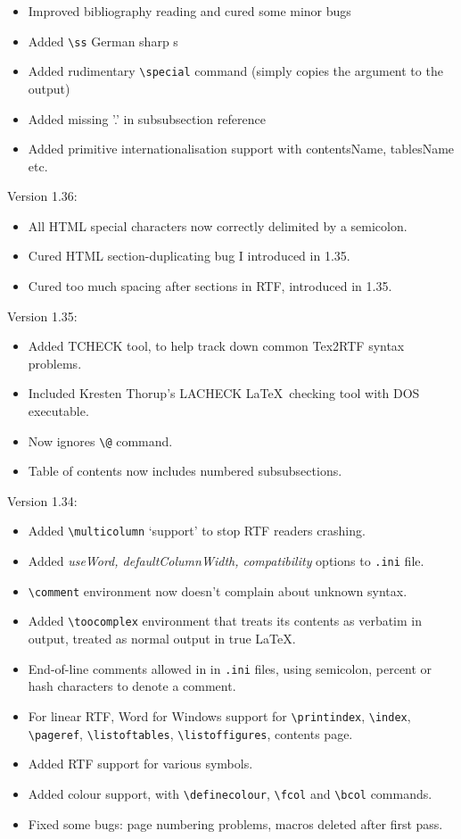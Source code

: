 \begin{itemize}
\itemsep=0pt
\item Improved bibliography reading and cured some minor bugs
\item Added \verb$\ss$ German sharp s
\item Added rudimentary \verb$\special$ command (simply copies the argument
to the output)
\item Added missing '.' in subsubsection reference
\item Added primitive internationalisation support with contentsName, tablesName etc.
\end{itemize}

Version 1.36:

\begin{itemize}
\itemsep=0pt
\item All HTML special characters now correctly delimited by a semicolon.
\item Cured HTML section-duplicating bug I introduced in 1.35.
\item Cured too much spacing after sections in RTF, introduced in 1.35.
\end{itemize}

Version 1.35:

\begin{itemize}
\itemsep=0pt
\item Added TCHECK tool, to help track down common Tex2RTF syntax problems.
\item Included Kresten Thorup's LACHECK \LaTeX\ checking tool with DOS executable.
\item Now ignores \verb|\@| command.
\item Table of contents now includes numbered subsubsections.
\end{itemize}

Version 1.34:

\begin{itemize}
\itemsep=0pt
\item Added \verb$\multicolumn$ `support' to stop RTF readers crashing.
\item Added {\it useWord, defaultColumnWidth, compatibility} options to {\tt .ini} file.
\item \verb$\comment$ environment now doesn't complain about unknown syntax.
\item Added \verb$\toocomplex$ environment that treats its contents as
verbatim in output, treated as normal output in true \LaTeX.
\item End-of-line comments allowed in in {\tt .ini} files, using semicolon,
percent or hash characters to denote a comment.
\item For linear RTF, Word for Windows support for \verb$\printindex$,\rtfsp
\verb$\index$, \verb$\pageref$, \verb$\listoftables$, \verb$\listoffigures$, contents page.
\item Added RTF support for various symbols.
\item Added colour support, with \verb$\definecolour$, \verb$\fcol$ and \verb$\bcol$ commands.
\item Fixed some bugs: page numbering problems, macros deleted after first pass.
\end{itemize}

